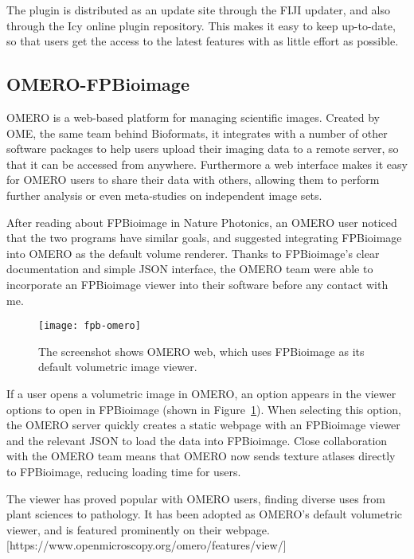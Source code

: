 The plugin is distributed as an update site through the FIJI updater, and also through the Icy online plugin repository. 
This makes it easy to keep up-to-date, so that users get the access to the latest features with as little effort as possible. 

\subsection{OMERO-FPBioimage}
OMERO is a web-based platform for managing scientific images. 
Created by OME, the same team behind Bioformats, it integrates with a number of other software packages to help users upload their imaging data to a remote server, so that it can be accessed from anywhere. 
Furthermore a web interface makes it easy for OMERO users to share their data with others, allowing them to perform further analysis or even meta-studies on independent image sets.

After reading about FPBioimage in Nature Photonics, an OMERO user noticed that the two programs have similar goals, and suggested integrating FPBioimage into OMERO as the default volume renderer. 
Thanks to FPBioimage's clear documentation and simple JSON interface, the OMERO team were able to incorporate an FPBioimage viewer into their software before any contact with me. 

\begin{figure}[htbp!]
\centering
\texttt{[image: fpb-omero]}
\caption[FPBioimage: OMERO.web uses FPBioimage as its default renderer for 3D data]{The screenshot shows OMERO web, which uses FPBioimage as its default volumetric image viewer. } %
\label{fig:fpbOMERO}
\end{figure}

If a user opens a volumetric image in OMERO, an option appears in the viewer options to open in FPBioimage (shown in Figure~\ref{fig:fpbOMERO}). 
When selecting this option, the OMERO server quickly creates a static webpage with an FPBioimage viewer and the relevant JSON to load the data into FPBioimage. 
Close collaboration with the OMERO team means that OMERO now sends texture atlases directly to FPBioimage, reducing loading time for users. 

The viewer has proved popular with OMERO users, finding diverse uses from plant sciences to pathology.
It has been adopted as OMERO's default volumetric viewer, and is featured prominently on their webpage. [https://www.openmicroscopy.org/omero/features/view/]


